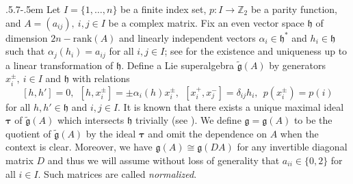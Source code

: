 \documentclass[11pt,reqno]{amsart}
\makeatletter
\theoremstyle{plain}
\theoremstyle{definition}
\theoremstyle{remark}
\newcommand{\lie}[1]{\mathfrak{#1}}
\newcommand\bz{\mathbb Z}
\numberwithin{equation}{section}
\def\subsection{\def\@secnumfont{\bfseries}\@startsection{subsection}{2}%
  {\parindent}{.5\linespacing\@plus.7\linespacing}{-.5em}%
  {\normalfont\bfseries}}
\makeatother
\begin{document}
\subsection{} Let $I=\{1,\dots,n\}$ be a finite index set, $p:I\rightarrow \bz_{2}$ be a parity function, and $A=(a_{ij}),\ i,j\in I$ be a complex matrix. Fix an even vector space $\lie{h}$ of dimension $2n-\mathrm{rank}(A)$ and linearly independent vectors $\alpha_i\in\lie{h}^*$ and $h_i\in \lie{h}$ such that $\alpha_j(h_i)=a_{ij}$ for all $i,j\in I$; see \cite{Kac90Infinite} for the existence and uniqueness up to a linear transformation of $\lie h$. Define a Lie superalgebra $\tilde{\lie{g}}(A)$ by generators $x_{i}^{\pm},\ i\in I$ and $\lie h$ with relations
$$[h,h']=0,\ \ [h,x_{i}^{\pm}]=\pm \alpha_i(h)x_i^\pm,\ \ [x_i^+,x_j^-]=\delta_{ij}h_i,\ \ p(x_i^\pm)=p(i)$$ for all $h,h'\in \lie{h}$ and $i,j\in I$. 
It is known that there exists a unique maximal ideal $\boldsymbol{\tau}$ of $\tilde{\lie{g}}(A)$ which intersects $\lie{h}$ trivially (see \cite[Proposition 2.2]{vander89Classification}). We define $\lie g=\lie{g}(A)$ to be the quotient of $\tilde{\lie{g}}(A)$ by the ideal $\boldsymbol{\tau}$ and omit the dependence on $A$ when the context is clear. Moreover, we have $\lie{g}(A)\cong \lie{g}(DA)$ for any invertible diagonal matrix $D$ and thus we will assume without loss of generality that $a_{ii}\in\{0,2\}$ for all $i\in I$. Such matrices are called \textit{normalized}.
\end{document}
